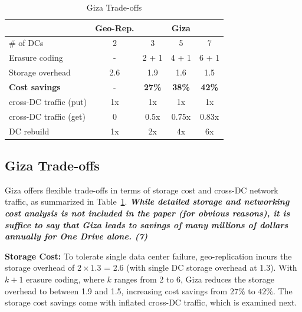 \begin{table}[tp]
\centering
\footnotesize
\begin{tabular}{|l||c||c|c|c|}
\hline
											& Geo-Rep.						& \multicolumn{3}{c|}{Giza}
\\ \hline \hline
\# of DCs 						& 2										& 3 		& 5 		& 7
\\ \hline
Erasure coding 				& -										& 2 + 1	& 4 + 1	& 6 + 1
\\ \hline \hline
Storage overhead			& 2.6									& 1.9 	& 1.6 	& 1.5
\\ \hline
{\bf Cost savings}		& -										& {\bf 27\%} 	& {\bf 38\%} 	& {\bf 42\%}
\\ \hline \hline
cross-DC traffic (put)& 1x									& 1x 		& 1x 		& 1x
\\ \hline
cross-DC traffic (get)& 0										& 0.5x 	& 0.75x & 0.83x
\\ \hline
DC rebuild 						& 1x									& 2x 		& 4x 		& 6x
\\ \hline \hline
\end{tabular}
\caption{Giza Trade-offs}
\label{tab:cost_benefit}
\end{table}


\subsection{Giza Trade-offs}
\label{sec:alternative}

Giza offers flexible trade-offs in terms of storage cost and cross-DC network traffic,
as summarized in Table~\ref{tab:cost_benefit}. \textit{\textbf{While detailed storage and networking cost analysis is not included in the paper (for obvious reasons), it is suffice to say that Giza leads to savings of many millions of dollars annually for One Drive alone. (7)}}

{\bf Storage Cost:}
To tolerate single data center failure, geo-replication incurs the storage overhead of $2\times1.3$ = 2.6 (with single DC storage overhead at 1.3).
With $k+1$ erasure coding, where $k$ ranges from 2 to 6, Giza reduces the storage overhead to between 1.9 and 1.5, increasing cost savings from $27\%$ to $42\%$.
The storage cost savings come with inflated cross-DC traffic, which is examined next.

